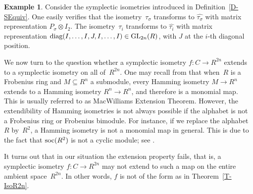 \documentclass[11pt]{article}
\theoremstyle{definition}
\newtheorem{exa}[theo]{Example}
\numberwithin{equation}{section}
\newcommand{\soc}{\mbox{\rm soc}}
\newcommand{\GL}{\mathrm{GL}}
\newcommand{\diag}{\textup{diag}}
\newcounter{alp}
\newcounter{rom}
\begin{document}
\begin{exa}\label{E-Tausigmai}
Consider the symplectic isometries introduced in Definition~\ref{D-SEquiv}.
One easily verifies that the isometry~$\tau_\sigma$ transforms to $\widehat{\tau_{\sigma}}$ with matrix representation $P_{\sigma}\otimes I_2$.
The isometry~$\tau_i$ transforms to $\widehat{\tau_i}$ with matrix representation $\diag(I,\ldots,I,J,I,\ldots,I)\in\GL_{2n}(R)$, with $J$ at the $i$-th diagonal position.
\end{exa}


We now turn to the question whether a symplectic isometry $f:C\longrightarrow R^{2n}$ extends to a symplectic isometry
on all of~$R^{2n}$.
One may recall from \cite[Theorem 6.3]{Wo99} that when~$R$ is a Frobenius ring and $M\subseteq R^n$ a submodule,
every Hamming isometry
$M\longrightarrow R^n$ extends to a Hamming isometry $R^n \longrightarrow R^n$, and therefore is a monomial map.
This is usually referred to as MacWilliams Extension Theorem.
However, the extendibility of Hamming isometries is not always possible if the alphabet is not a Frobenius ring or Frobenius bimodule.
For instance, if we replace the alphabet~$R$ by~$R^2$, a Hamming isometry is not a monomial map in general.
This is due to the fact that $\soc(R^2)$ is not a cyclic module; see \cite[Theorem 5.2]{Wo09}.

It turns out that in our situation the extension property fails, that is, a symplectic isometry $f:C\longrightarrow R^{2n}$ may not extend to such a map on the entire ambient space~$R^{2n}$. In other words, $f$ is not of the form as in Theorem~\ref{T-IsoR2n}.
\end{document}
